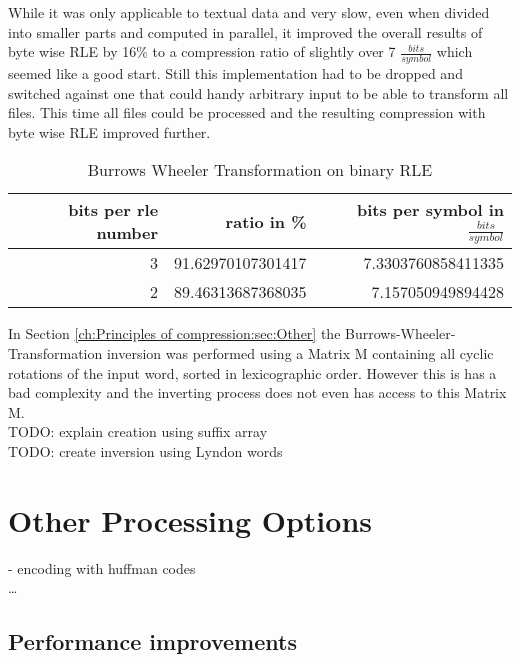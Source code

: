 \par{
While it was only applicable to textual data and very slow, even when divided into smaller parts and computed in parallel, it improved the overall results of byte wise RLE by 16\% to a compression ratio of slightly over 7 $\frac{bits}{symbol}$ which seemed like a good start. Still this implementation had to be dropped and switched against one that could handy arbitrary input to be able to transform all files. This time all files could be processed and the resulting compression with byte wise RLE improved further.

\begin{table}[h]
	\centering
	\begin{tabular}{r|r|r}	
		bits per rle number & ratio in \% & bits per symbol in $\frac{bits}{symbol}$\\
		\hline
		3 & 91.62970107301417 & 7.3303760858411335\\
		2 & 89.46313687368035 & 7.157050949894428
	\end{tabular}
	\caption{Burrows Wheeler Transformation on binary RLE}
	\label{tab:t12 Burrows Wheeler Transformation on binary RLE}
\end{table}
}

\par{
In Section \ref{ch:Principles of compression:sec:Other} the Burrows-Wheeler-Transformation inversion was performed using a Matrix M containing all cyclic rotations of the input word, sorted in lexicographic order. However this is has a bad complexity and the inverting process does not even has access to this Matrix M.\\

TODO: explain creation using suffix array \\

TODO: create inversion using Lyndon words\\
}


\section{Other Processing Options}
\label{ch:Conceptual Design:sec:Postprocessing}
- encoding with huffman codes\\
\ldots

\subsection{Performance improvements}

